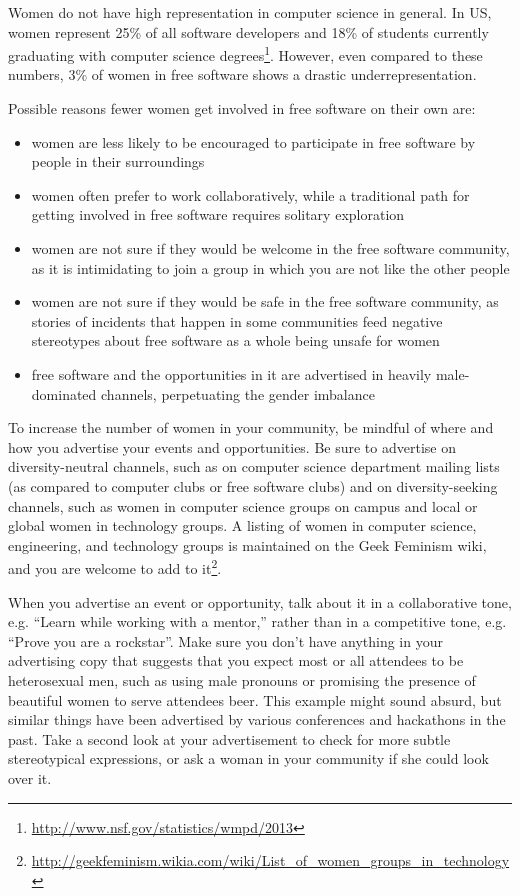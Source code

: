 Women do not have high representation in computer science in general. In US, women represent 25\% of all software developers and 18\% of students currently graduating with computer science degrees\footnote{\url{http://www.nsf.gov/statistics/wmpd/2013}}. However, even compared to these numbers, 3\% of women in free software shows a drastic underrepresentation.

Possible reasons fewer women get involved in free software on their own are:
\begin{itemize}
 \item women are less likely to be encouraged to participate in free software by people in their surroundings
 \item women often prefer to work collaboratively, while a traditional path for getting involved in free software requires solitary exploration
 \item women are not sure if they would be welcome in the free software community, as it is intimidating to join a group in which you are not like the other people
 \item women are not sure if they would be safe in the free software community, as stories of incidents that happen in some communities feed negative stereotypes about free software as a whole being unsafe for women
 \item free software and the opportunities in it are advertised in heavily male-dominated channels, perpetuating the gender imbalance
\end{itemize}

To increase the number of women in your community, be mindful of where and how you advertise your events and opportunities. Be sure to advertise on diversity-neutral channels, such as on computer science department mailing lists (as compared to computer clubs or free software clubs) and on diversity-seeking channels, such as women in computer science groups on campus and local or global women in technology groups. A listing of women in computer science, engineering, and technology groups is maintained on the Geek Feminism wiki, and you are welcome to add to it\footnote{\url{http://geekfeminism.wikia.com/wiki/List_of_women_groups_in_technology}}.

When you advertise an event or opportunity, talk about it in a collaborative tone, e.g.  “Learn while working with a mentor,” rather than in a competitive tone, e.g. “Prove you are a rockstar”. Make sure you don’t have anything in your advertising copy that suggests that you expect most or all attendees to be heterosexual men, such as using male pronouns or promising the presence of beautiful women to serve attendees beer. This example might sound absurd, but similar things have been advertised by various conferences and hackathons in the past. Take a second look at your advertisement to check for more subtle stereotypical expressions, or ask a woman in your community if she could look over it.

